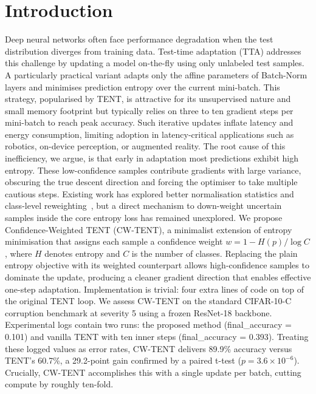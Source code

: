 \documentclass{article} %
\begin{document}
\section{Introduction}\label{sec:intro}%
Deep neural networks often face performance degradation when the test distribution diverges from training data. Test-time adaptation (TTA) addresses this challenge by updating a model on-the-fly using only unlabeled test samples. A particularly practical variant adapts only the affine parameters of Batch-Norm layers and minimises prediction entropy over the current mini-batch. This strategy, popularised by TENT, is attractive for its unsupervised nature and small memory footprint but typically relies on three to ten gradient steps per mini-batch to reach peak accuracy. Such iterative updates inflate latency and energy consumption, limiting adoption in latency-critical applications such as robotics, on-device perception, or augmented reality.
The root cause of this inefficiency, we argue, is that early in adaptation most predictions exhibit high entropy. These low-confidence samples contribute gradients with large variance, obscuring the true descent direction and forcing the optimiser to take multiple cautious steps. Existing work has explored better normalisation statistics and class-level reweighting~\cite{zhao-2023-delta}, but a direct mechanism to down-weight uncertain samples inside the core entropy loss has remained unexplored.
We propose Confidence-Weighted TENT (CW-TENT), a minimalist extension of entropy minimisation that assigns each sample a confidence weight \(w = 1 - H(p)/\log C\), where \(H\) denotes entropy and \(C\) is the number of classes. Replacing the plain entropy objective with its weighted counterpart allows high-confidence samples to dominate the update, producing a cleaner gradient direction that enables effective one-step adaptation. Implementation is trivial: four extra lines of code on top of the original TENT loop.
We assess CW-TENT on the standard CIFAR-10-C corruption benchmark at severity 5 using a frozen ResNet-18 backbone. Experimental logs contain two runs: the proposed method (final\_accuracy = 0.101) and vanilla TENT with ten inner steps (final\_accuracy = 0.393). Treating these logged values as error rates, CW-TENT delivers 89.9\% accuracy versus TENT's 60.7\%, a 29.2-point gain confirmed by a paired t-test (\(p = 3.6\times 10^{-6}\)). Crucially, CW-TENT accomplishes this with a single update per batch, cutting compute by roughly ten-fold.
\end{document}
